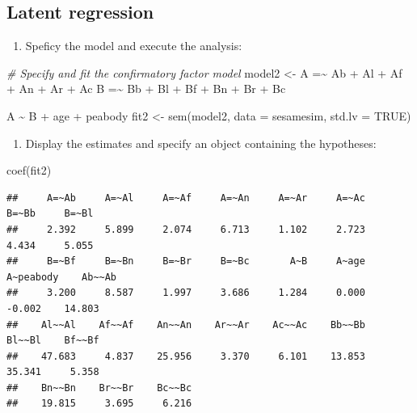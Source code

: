 \documentclass[
]{book}
\newenvironment{Shaded}{\begin{snugshade}}{\end{snugshade}}
\newcommand{\AttributeTok}[1]{\textcolor[rgb]{0.77,0.63,0.00}{#1}}
\newcommand{\CommentTok}[1]{\textcolor[rgb]{0.56,0.35,0.01}{\textit{#1}}}
\newcommand{\ConstantTok}[1]{\textcolor[rgb]{0.00,0.00,0.00}{#1}}
\newcommand{\FunctionTok}[1]{\textcolor[rgb]{0.00,0.00,0.00}{#1}}
\newcommand{\NormalTok}[1]{#1}
\newcommand{\OtherTok}[1]{\textcolor[rgb]{0.56,0.35,0.01}{#1}}
\newcommand{\StringTok}[1]{\textcolor[rgb]{0.31,0.60,0.02}{#1}}
\providecommand{\tightlist}{%
  \setlength{\itemsep}{0pt}\setlength{\parskip}{0pt}}
\begin{document}
\hypertarget{latent-regression}{%
\subsection{Latent regression}\label{latent-regression}}

\begin{enumerate}
\def\labelenumi{\arabic{enumi})}
\tightlist
\item
  Speficy the model and execute the analysis:
\end{enumerate}

\begin{Shaded}
\begin{Highlighting}[]
\CommentTok{\#  Specify and fit the confirmatory factor model}
\NormalTok{model2 }\OtherTok{\textless{}{-}} \StringTok{\textquotesingle{}}
\StringTok{    A  =\textasciitilde{} Ab + Al + Af + An + Ar + Ac }
\StringTok{    B =\textasciitilde{} Bb + Bl + Bf + Bn + Br + Bc}

\StringTok{    A \textasciitilde{} B + age + peabody}
\StringTok{\textquotesingle{}}
\NormalTok{fit2 }\OtherTok{\textless{}{-}} \FunctionTok{sem}\NormalTok{(model2, }\AttributeTok{data =}\NormalTok{ sesamesim, }\AttributeTok{std.lv =} \ConstantTok{TRUE}\NormalTok{)}
\end{Highlighting}
\end{Shaded}

\begin{enumerate}
\def\labelenumi{\arabic{enumi})}
\setcounter{enumi}{1}
\tightlist
\item
  Display the estimates and specify an object containing the hypotheses:
\end{enumerate}

\begin{Shaded}
\begin{Highlighting}[]
\FunctionTok{coef}\NormalTok{(fit2)}
\end{Highlighting}
\end{Shaded}

\begin{verbatim}
##     A=~Ab     A=~Al     A=~Af     A=~An     A=~Ar     A=~Ac     B=~Bb     B=~Bl 
##     2.392     5.899     2.074     6.713     1.102     2.723     4.434     5.055 
##     B=~Bf     B=~Bn     B=~Br     B=~Bc       A~B     A~age A~peabody    Ab~~Ab 
##     3.200     8.587     1.997     3.686     1.284     0.000    -0.002    14.803 
##    Al~~Al    Af~~Af    An~~An    Ar~~Ar    Ac~~Ac    Bb~~Bb    Bl~~Bl    Bf~~Bf 
##    47.683     4.837    25.956     3.370     6.101    13.853    35.341     5.358 
##    Bn~~Bn    Br~~Br    Bc~~Bc 
##    19.815     3.695     6.216
\end{verbatim}
\end{document}
